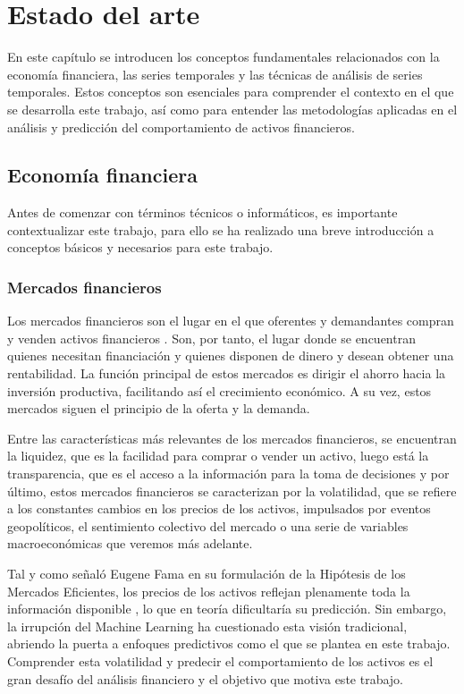 \chapter{Estado del arte}
\label{ch:Estadoarte}

En este capítulo se introducen los conceptos fundamentales relacionados con la economía financiera, las series temporales y las técnicas de análisis de series temporales. Estos conceptos son esenciales para comprender el contexto en el que se desarrolla este trabajo, así como para entender las metodologías aplicadas en el análisis y predicción del comportamiento de activos financieros.
\section{Economía financiera}
Antes de comenzar con términos técnicos o informáticos, es importante contextualizar este trabajo, para ello se ha realizado una breve introducción a conceptos básicos y necesarios para este trabajo.

\subsection{Mercados financieros}
Los mercados financieros son el lugar en el que oferentes y demandantes compran y venden activos financieros \cite{raisin_mercados}. Son, por tanto, el lugar donde se encuentran quienes necesitan financiación y quienes disponen de dinero y desean obtener una rentabilidad. La función principal de estos mercados es dirigir el ahorro hacia la inversión productiva, facilitando así el crecimiento económico. A su vez, estos mercados siguen el principio de la oferta y la demanda.

Entre las características más relevantes de los mercados financieros, se encuentran la liquidez, que es la facilidad para comprar o vender un activo, luego está la transparencia, que es el acceso a la información para la toma de decisiones y por último, estos mercados financieros se caracterizan por la volatilidad, que se refiere a los constantes cambios en los precios de los activos, impulsados por eventos geopolíticos, el sentimiento colectivo del mercado o una serie de variables macroeconómicas que veremos más adelante. 

Tal y como señaló Eugene Fama en su formulación de la Hipótesis de los Mercados Eficientes, los precios de los activos reflejan plenamente toda la información disponible \cite{fama1970}, lo que en teoría dificultaría su predicción. Sin embargo, la irrupción del Machine Learning ha cuestionado esta visión tradicional, abriendo la puerta a enfoques predictivos como el que se plantea en este trabajo. Comprender esta volatilidad y predecir el comportamiento de los activos es el gran desafío del análisis financiero y el objetivo que motiva este trabajo.

